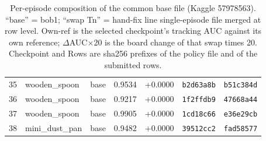 \begin{table}[ht]
{\begin{tabular}{@{}rllrrll@{}}
35 & wooden\_spoon & base & 0.9534 & +0.0000 & \texttt{b2d63a8b} & \texttt{b51c384d} \\
36 & wooden\_spoon & base & 0.9217 & +0.0000 & \texttt{1f2ffdb9} & \texttt{47668a44} \\
37 & wooden\_spoon & base & 0.9905 & +0.0000 & \texttt{1cd18c66} & \texttt{e36e29cb} \\
38 & mini\_dust\_pan & base & 0.9482 & +0.0000 & \texttt{39512cc2} & \texttt{fad58577} \\
\bottomrule
\end{tabular}}
  \caption{Per-episode composition of the common base file (Kaggle 57978563). ``base'' = bob1; ``swap Tn'' = hand-fix line
  single-episode file merged at row level. Own-ref is the selected checkpoint's tracking AUC against
  its own reference; $\Delta$AUC$\times$20 is the board change of that swap times 20. Checkpoint and
  Rows are sha256 prefixes of the policy file and of the submitted rows.}
  \label{tab:provenance}
\end{table}

